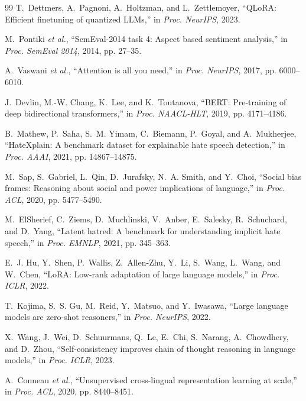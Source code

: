 \documentclass[conference]{IEEEtran}
\begin{document}
\begin{thebibliography}{99}
T.~Dettmers, A.~Pagnoni, A.~Holtzman, and L.~Zettlemoyer, ``QLoRA: Efficient
finetuning of quantized LLMs,'' in \textit{Proc. NeurIPS}, 2023.

M.~Pontiki \textit{et al.}, ``SemEval-2014 task 4: Aspect based sentiment analysis,''
in \textit{Proc. SemEval 2014}, 2014, pp. 27--35.

A.~Vaswani \textit{et al.}, ``Attention is all you need,'' in \textit{Proc. NeurIPS},
2017, pp. 6000--6010.

J.~Devlin, M.-W. Chang, K.~Lee, and K.~Toutanova, ``BERT: Pre-training of deep
bidirectional transformers,'' in \textit{Proc. NAACL-HLT}, 2019, pp. 4171--4186.


B.~Mathew, P.~Saha, S.~M. Yimam, C.~Biemann, P.~Goyal, and A.~Mukherjee,
``HateXplain: A benchmark dataset for explainable hate speech detection,'' in
\textit{Proc. AAAI}, 2021, pp. 14867--14875.

M.~Sap, S.~Gabriel, L.~Qin, D.~Jurafsky, N.~A. Smith, and Y.~Choi, ``Social bias
frames: Reasoning about social and power implications of language,'' in \textit{Proc.
ACL}, 2020, pp. 5477--5490.

M.~ElSherief, C.~Ziems, D.~Muchlinski, V.~Anber, E.~Salesky, R.~Schuchard, and
D.~Yang, ``Latent hatred: A benchmark for understanding implicit hate speech,'' in
\textit{Proc. EMNLP}, 2021, pp. 345--363.

E.~J. Hu, Y.~Shen, P.~Wallis, Z.~Allen-Zhu, Y.~Li, S.~Wang, L.~Wang, and W.~Chen,
``LoRA: Low-rank adaptation of large language models,'' in \textit{Proc. ICLR}, 2022.

T.~Kojima, S.~S. Gu, M.~Reid, Y.~Matsuo, and Y.~Iwasawa, ``Large language models are
zero-shot reasoners,'' in \textit{Proc. NeurIPS}, 2022.

X.~Wang, J.~Wei, D.~Schuurmans, Q.~Le, E.~Chi, S.~Narang, A.~Chowdhery, and
D.~Zhou, ``Self-consistency improves chain of thought reasoning in language models,''
in \textit{Proc. ICLR}, 2023.

A.~Conneau \textit{et al.}, ``Unsupervised cross-lingual representation learning at
scale,'' in \textit{Proc. ACL}, 2020, pp. 8440--8451.


\end{thebibliography}
\end{document}
